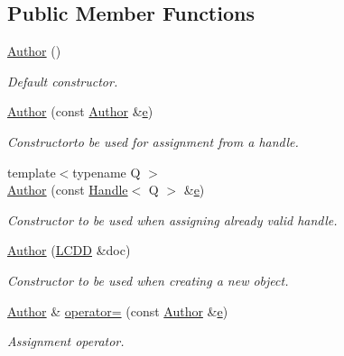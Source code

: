\subsection*{Public Member Functions}
\begin{DoxyCompactItemize}
\item 
\hyperlink{class_d_d4hep_1_1_geometry_1_1_author_a2803ac1dacb60ce706d59c4e1378f93c}{Author} ()
\begin{DoxyCompactList}\small\item\em Default constructor. \end{DoxyCompactList}\item 
\hyperlink{class_d_d4hep_1_1_geometry_1_1_author_a9f58da7da25568979eac0c706e6f9d88}{Author} (const \hyperlink{class_d_d4hep_1_1_geometry_1_1_author}{Author} \&\hyperlink{_volumes_8cpp_a8a9a1f93e9b09afccaec215310e64142}{e})
\begin{DoxyCompactList}\small\item\em Constructorto be used for assignment from a handle. \end{DoxyCompactList}\item 
{\footnotesize template$<$typename Q $>$ }\\\hyperlink{class_d_d4hep_1_1_geometry_1_1_author_addc7cfd45bbc61c06328da0006150226}{Author} (const \hyperlink{class_d_d4hep_1_1_handle}{Handle}$<$ Q $>$ \&\hyperlink{_volumes_8cpp_a8a9a1f93e9b09afccaec215310e64142}{e})
\begin{DoxyCompactList}\small\item\em Constructor to be used when assigning already valid handle. \end{DoxyCompactList}\item 
\hyperlink{class_d_d4hep_1_1_geometry_1_1_author_a9b8aae7585fe19fce420630f7fdd0d55}{Author} (\hyperlink{class_d_d4hep_1_1_geometry_1_1_l_c_d_d}{L\+C\+DD} \&doc)
\begin{DoxyCompactList}\small\item\em Constructor to be used when creating a new object. \end{DoxyCompactList}\item 
\hyperlink{class_d_d4hep_1_1_geometry_1_1_author}{Author} \& \hyperlink{class_d_d4hep_1_1_geometry_1_1_author_a59a753444504866fdb2c4e798823cd17}{operator=} (const \hyperlink{class_d_d4hep_1_1_geometry_1_1_author}{Author} \&\hyperlink{_volumes_8cpp_a8a9a1f93e9b09afccaec215310e64142}{e})
\begin{DoxyCompactList}\small\item\em Assignment operator. \end{DoxyCompactList}\item 

\end{DoxyCompactItemize}
